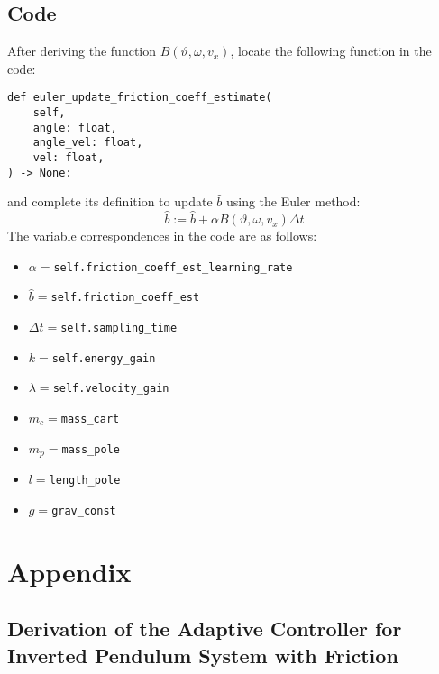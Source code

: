 \documentclass[12pt]{article}
\begin{document}
\subsection*{Code}
After deriving the function $B(\vartheta, \omega, v_x)$, locate the following function in the code:
\begin{verbatim}
def euler_update_friction_coeff_estimate(
    self,
    angle: float, 
    angle_vel: float, 
    vel: float,
) -> None:
\end{verbatim}
and complete its definition to update $\hat{b}$ using the Euler method:
\begin{equation*}
    \hat{b} := \hat{b} + \alpha B(\vartheta, \omega, v_x) \Delta t
\end{equation*}
The variable correspondences in the code are as follows:
\begin{itemize}
    \item $\alpha=$\texttt{self.friction\_coeff\_est\_learning\_rate}
    \item $\hat{b} =$\texttt{self.friction\_coeff\_est}
    \item $\Delta t =$\texttt{self.sampling\_time}
    \item $k=$\texttt{self.energy\_gain}
    \item $\lambda=$\texttt{self.velocity\_gain}
    \item $m_c=$\texttt{mass\_cart}
    \item $m_p=$\texttt{mass\_pole}
    \item $l=$\texttt{length\_pole}
    \item $g=$\texttt{grav\_const}
\end{itemize}

\newpage
\section*{Appendix}

\subsection*{Derivation of the Adaptive Controller for Inverted Pendulum System with Friction}
\end{document}
